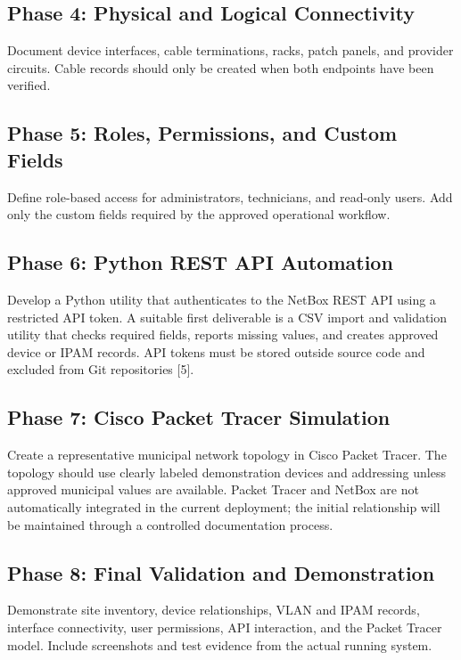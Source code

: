 \documentclass[11pt,a4paper,oneside]{report}
\begin{document}
\subsection{Phase 4: Physical and Logical Connectivity}
Document device interfaces, cable terminations, racks, patch panels, and provider circuits. Cable records should only be created when both endpoints have been verified.

\subsection{Phase 5: Roles, Permissions, and Custom Fields}
Define role-based access for administrators, technicians, and read-only users. Add only the custom fields required by the approved operational workflow.

\subsection{Phase 6: Python REST API Automation}
Develop a Python utility that authenticates to the NetBox REST API using a restricted API token. A suitable first deliverable is a CSV import and validation utility that checks required fields, reports missing values, and creates approved device or IPAM records. API tokens must be stored outside source code and excluded from Git repositories [5].

\subsection{Phase 7: Cisco Packet Tracer Simulation}
Create a representative municipal network topology in Cisco Packet Tracer. The topology should use clearly labeled demonstration devices and addressing unless approved municipal values are available. Packet Tracer and NetBox are not automatically integrated in the current deployment; the initial relationship will be maintained through a controlled documentation process.

\subsection{Phase 8: Final Validation and Demonstration}
Demonstrate site inventory, device relationships, VLAN and IPAM records, interface connectivity, user permissions, API interaction, and the Packet Tracer model. Include screenshots and test evidence from the actual running system.
\end{document}
